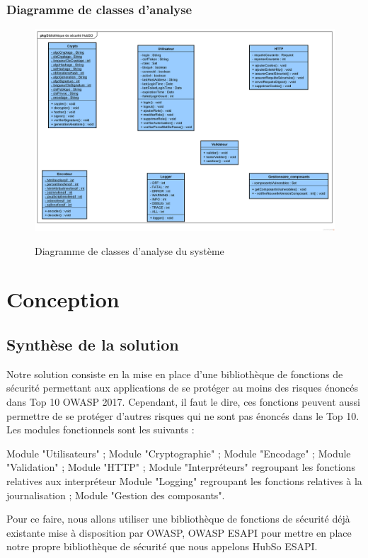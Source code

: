 \subsubsection{Diagramme de classes d'analyse}
\begin{figure}[H]
	\centering
	\begin{minipage}{12cm}
		\centering
		{\includegraphics[height=0.5\textheight, width=1.2\textwidth]{fig/Analyse-Class-Diagram.png}}
	\end{minipage}
	\caption{Diagramme de classes d'analyse du système}
	\label{fig:7.20}
\end{figure}

\section{Conception}
\subsection{Synthèse de la solution}
Notre solution consiste en la mise en place d'une bibliothèque de fonctions de sécurité permettant aux applications de se protéger au moins des risques énoncés dans Top 10 OWASP 2017. Cependant, il faut le dire, ces fonctions peuvent aussi permettre de se protéger d'autres risques qui ne sont pas énoncés dans le Top 10. Les modules fonctionnels sont les suivants :
\begin{itemize}
	\itemcheck Module "Utilisateurs" ;
	\itemcheck Module "Cryptographie" ; 
	\itemcheck Module "Encodage" ; 
	\itemcheck Module "Validation" ; 
	\itemcheck Module "HTTP" ;
	\itemcheck Module "Interpréteurs" regroupant les fonctions relatives aux interpréteur
	\itemcheck Module "Logging" regroupant les fonctions relatives à la journalisation ; 
	\itemcheck Module "Gestion des composants".
\end{itemize}
Pour ce faire, nous allons utiliser une bibliothèque de fonctions de sécurité déjà existante mise à disposition par OWASP, OWASP ESAPI pour mettre en place notre propre bibliothèque de sécurité que nous appelons HubSo ESAPI.
